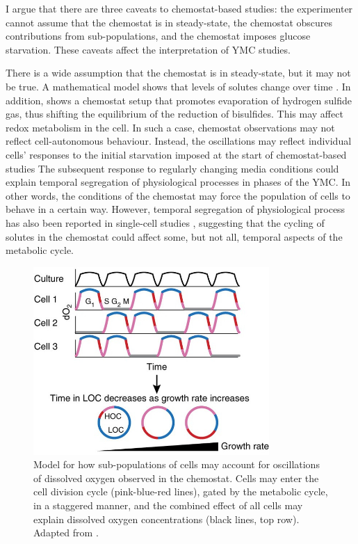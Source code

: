 I argue that there are three caveats to chemostat-based studies:
the experimenter cannot assume that the chemostat is in steady-state,
the chemostat obscures contributions from sub-populations,
and the chemostat imposes glucose starvation.
These caveats affect the interpretation of YMC studies.

There is a wide assumption that the chemostat is in steady-state, but it may not be true.
A mathematical model shows that levels of solutes change over time \parencite{jonesCyberneticModelGrowth1999}.
In addition, \textcite{oneillEukaryoticCellBiology2020} shows a chemostat setup that promotes evaporation of hydrogen sulfide gas, thus shifting the equilibrium of the reduction of bisulfides.
This may affect redox metabolism in the cell.
In such a case, chemostat observations may not reflect cell-autonomous behaviour.
Instead, the oscillations may reflect individual cells' responses to the initial starvation imposed at the start of chemostat-based studies
The subsequent response to regularly changing media conditions could explain temporal segregation of physiological processes in phases of the YMC.
In other words, the conditions of the chemostat may force the population of cells to behave in a certain way.
However, temporal segregation of physiological process has also been reported in single-cell studies \parencite{takhaveevTemporalSegregationBiosynthetic2023}, suggesting that the cycling of solutes in the chemostat could affect some, but not all, temporal aspects of the metabolic cycle.

\begin{figure}
  \centering
  \includegraphics[width=0.8\textwidth]{mellorMolecularBasisMetabolic2016_3b_adapted}
  \caption[
    Model for how sub-populations of cells may account for oscillations of dissolved oxygen observed in the chemostat
  ]{
    Model for how sub-populations of cells may account for oscillations of dissolved oxygen observed in the chemostat.
    Cells may enter the cell division cycle (pink-blue-red lines), gated by the metabolic cycle, in a staggered manner, and the combined effect of all cells may explain dissolved oxygen concentrations (black lines, top row).
    Adapted from \textcite{mellorMolecularBasisMetabolic2016}.}
  \label{fig:intro-ymc-populations}
\end{figure}

